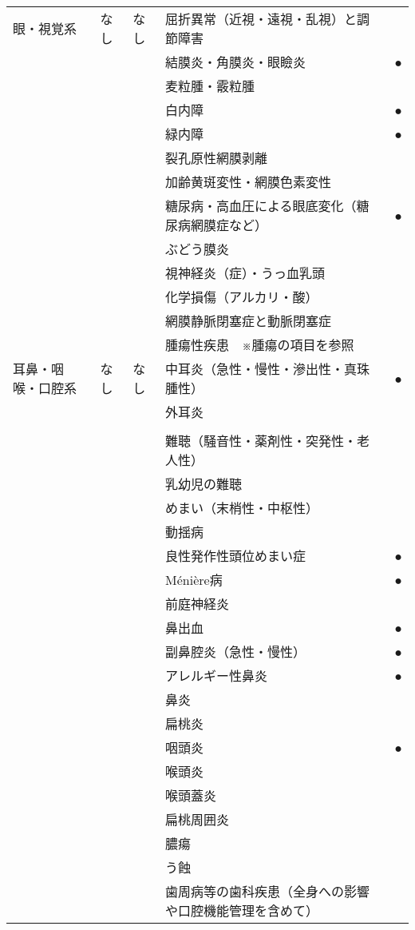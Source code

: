 \begin{xltabular}{\linewidth}{XXXXX}
眼・視覚系 & なし & なし & 屈折異常（近視・遠視・乱視）と調節障害 &  \\
 &  &  & 結膜炎・角膜炎・眼瞼炎 & ● \\
 &  &  & 麦粒腫・霰粒腫 &  \\
 &  &  & 白内障 & ● \\
 &  &  & 緑内障 & ● \\
 &  &  & 裂孔原性網膜剥離 &  \\
 &  &  & 加齢黄斑変性・網膜色素変性 &  \\
 &  &  & 糖尿病・高血圧による眼底変化（糖尿病網膜症など） & ● \\
 &  &  & ぶどう膜炎 &  \\
 &  &  & 視神経炎（症）・うっ血乳頭 &  \\
 &  &  & 化学損傷（アルカリ・酸） &  \\
 &  &  & 網膜静脈閉塞症と動脈閉塞症 &  \\
 &  &  & 腫瘍性疾患　※腫瘍の項目を参照 &  \\
耳鼻・咽喉・口腔系 & なし & なし & 中耳炎（急性・慢性・滲出性・真珠腫性） & ● \\
 &  &  & 外耳炎 &  \\
 &  &  &  &  \\
 &  &  & 難聴（騒音性・薬剤性・突発性・老人性） &  \\
 &  &  & 乳幼児の難聴 &  \\
 &  &  & めまい（末梢性・中枢性） &  \\
 &  &  & 動揺病 &  \\
 &  &  & 良性発作性頭位めまい症 & ● \\
 &  &  & Ménière病 & ● \\
 &  &  & 前庭神経炎 &  \\
 &  &  & 鼻出血 & ● \\
 &  &  & 副鼻腔炎（急性・慢性） & ● \\
 &  &  & アレルギー性鼻炎 & ● \\
 &  &  & 鼻炎 &  \\
 &  &  & 扁桃炎 &  \\
 &  &  & 咽頭炎 & ● \\
 &  &  & 喉頭炎 &  \\
 &  &  & 喉頭蓋炎 &  \\
 &  &  & 扁桃周囲炎 &  \\
 &  &  & 膿瘍 &  \\
 &  &  & う蝕 &  \\
 &  &  & 歯周病等の歯科疾患（全身への影響や口腔機能管理を含めて） &  \\

\end{xltabular}
